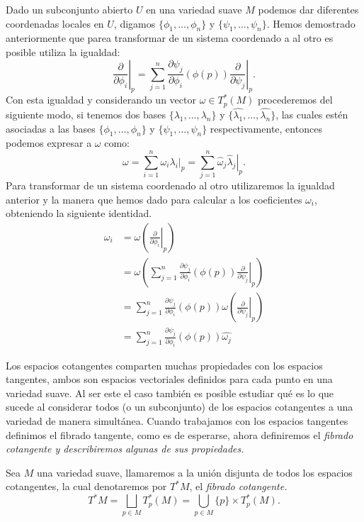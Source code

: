 Dado un subconjunto abierto $U$ en una variedad suave $M$ podemos dar diferentes coordenadas locales en $U$, digamos $\{\phi_1,\ldots,\phi_n\}$ y $\{\psi_1,\ldots,\psi_n\}$. Hemos demostrado anteriormente que parea transformar de un sistema coordenado a al otro es posible utiliza la igualdad:
\[
	\left. \frac{\partial}{\partial \phi_i} \right|_p =
	\sum_{j=1}^{n} \left. \frac{\partial \psi_j}{\partial \phi_i} (\phi(p))
	\frac{\partial}{\partial \psi_j} \right|_{p}.
\]
Con esta igualdad y considerando un vector $\omega \in T_{p}^{*}(M)$ procederemos del siguiente modo, si tenemos dos bases $\{\lambda_1,\ldots,\lambda_n\}$ y $\{\hat{\lambda_1},\ldots,\hat{\lambda_n}\}$, las cuales estén asociadas a las bases $\{\phi_1, \ldots, \phi_n\}$ y $\{\psi_1, \ldots, \psi_n\}$ respectivamente, entonces podemos expresar a $\omega$ como:
\[
	\omega = \sum_{i=1}^{n} \left. \omega_i \lambda_i \right|_p
	= \sum_{j=1}^{n} \left. \hat{\omega}_j \hat{\lambda}_j \right|_p.
\]
Para transformar de un sistema coordenado al otro utilizaremos la igualdad anterior y la manera que hemos dado para calcular a los coeficientes $\omega_i$, obteniendo la siguiente identidad.
\begin{align*}
	\omega_i & = \omega
	\left(
	\left. \frac{\partial}{\partial \phi_i} \right|_{p}
	\right)                                                                       \\
	         & = \omega
	\left(
	\sum_{j=1}^{n} \frac{\partial \psi_j}{\partial \phi_i} (\phi(p))
	\left. \frac{\partial}{\partial \psi_j}\right|_{p} \right)                    \\
	         & = \sum_{j=1}^{n} \frac{\partial \psi_j}{\partial \phi_i} (\phi(p))
	\omega \left( \left. \frac{\partial}{\partial \psi_j}\right|_{p} \right)      \\
	         & = \sum_{j=1}^{n} \frac{\partial \psi_j}{\partial \phi_i} (\phi(p))
	\hat{\omega_j}
\end{align*}

Los espacios cotangentes comparten muchas propiedades con los espacios tangentes, ambos son espacios vectoriales definidos para cada punto en una variedad suave. Al ser este el caso también es posible estudiar qué es lo que sucede al considerar todos (o un subconjunto) de los espacios cotangentes a una variedad de manera simultánea. Cuando trabajamos con los espacios tangentes definimos el fibrado tangente, como es de esperarse, ahora definiremos el \it{fibrado cotangente} y describiremos algunas de sus propiedades.

\begin{definition}
	Sea $M$ una variedad suave, llamaremos a la unión disjunta de todos los espacios cotangentes, la cual denotaremos por $T^{*}M$, el \it{fibrado cotangente}.
	\[ T^{*}M = \bigsqcup_{p \in M} T_{p}^{*}(M) = \bigcup_{p \in M} \{p\} \times T_{p}^{*}(M). \]
\end{definition}

